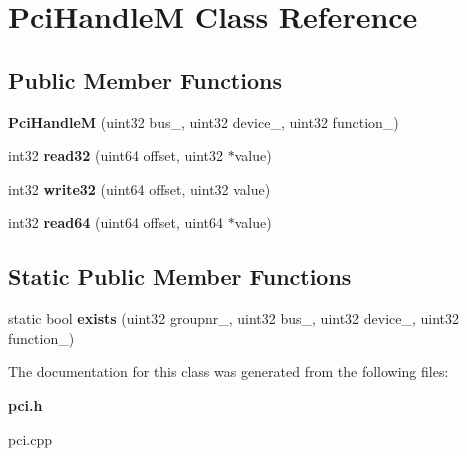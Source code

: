 \section{Pci\+HandleM Class Reference}
\label{classPciHandleM}
\subsection*{Public Member Functions}
\begin{DoxyCompactItemize}
\item 
\mbox{\label{classPciHandleM_ad067fc750d7b2f05b9e67badbdf237d3}} 
{\bfseries Pci\+HandleM} (uint32 bus\+\_\+, uint32 device\+\_\+, uint32 function\+\_\+)
\item 
\mbox{\label{classPciHandleM_ac9257ce7ae864201459f4db8996de7f6}} 
int32 {\bfseries read32} (uint64 offset, uint32 $\ast$value)
\item 
\mbox{\label{classPciHandleM_a412df968cfe50c405aa445c2b52bf6b1}} 
int32 {\bfseries write32} (uint64 offset, uint32 value)
\item 
\mbox{\label{classPciHandleM_a8fced207ab30a888b09ce361d1a45980}} 
int32 {\bfseries read64} (uint64 offset, uint64 $\ast$value)
\end{DoxyCompactItemize}
\subsection*{Static Public Member Functions}
\begin{DoxyCompactItemize}
\item 
\mbox{\label{classPciHandleM_abfddf061727ba8a87c13aafc92be3c20}} 
static bool {\bfseries exists} (uint32 groupnr\+\_\+, uint32 bus\+\_\+, uint32 device\+\_\+, uint32 function\+\_\+)
\end{DoxyCompactItemize}


The documentation for this class was generated from the following files\+:\begin{DoxyCompactItemize}
\item 
\textbf{ pci.\+h}\item 
pci.\+cpp\end{DoxyCompactItemize}
